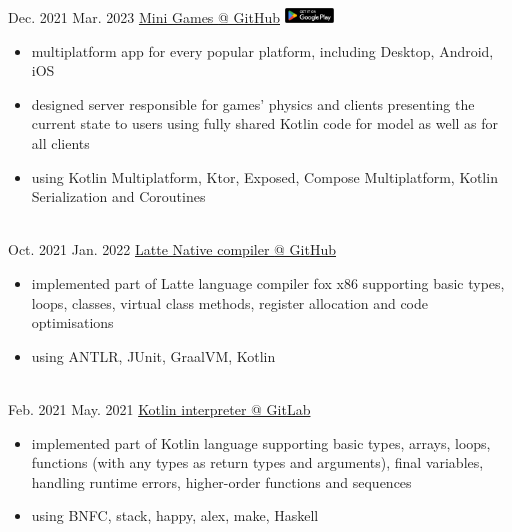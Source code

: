 \documentclass[a4paper]{twentysecondcv} %
\begin{document}
    \begin{twenty}
      \twentyitem
      {Dec. 2021}
      {Mar. 2023}
      {\href{https://github.com/avan1235/mini-games}{Mini Games {\footnotesize @ GitHub}} \href{https://play.google.com/store/apps/details?id=ml.dev.kotlin.minigames}{\includegraphics[width=1.3cm]{google-play-badge}}}
      {}
      {}
      {\begin{itemize}
         \item multiplatform app for every popular platform, including Desktop, Android, iOS
         \item designed server responsible for games' physics and clients presenting the current state to users using fully shared Kotlin code for model as well as for all clients
         \item using Kotlin Multiplatform, Ktor, Exposed, Compose Multiplatform, Kotlin Serialization and Coroutines
      \end{itemize}}
      \\
        \twentyitem
        {Oct. 2021}
        {Jan. 2022}
        {\href{https://github.com/avan1235/latte-compiler}{Latte Native compiler {\footnotesize @ GitHub}}}
        {}
        {}
        {\begin{itemize}
             \item implemented part of Latte language compiler fox x86 supporting basic types, loops, classes,
             virtual class methods, register allocation and code optimisations
             \item using ANTLR, JUnit, GraalVM, Kotlin
        \end{itemize}}
        \\
        \twentyitem
        {Feb. 2021}
        {May. 2021}
        {\href{https://gitlab.com/avan1235/kotlin-interpreter}{Kotlin interpreter {\footnotesize @ GitLab}}}
        {}
        {}
        {\begin{itemize}
             \item implemented part of Kotlin language supporting basic types, arrays, loops, functions
             (with any types as return types and arguments), final variables,
             handling runtime errors, higher-order functions and sequences
             \item using BNFC, stack, happy, alex, make, Haskell
        \end{itemize}}
        \\

\end{twenty}
\end{document}
